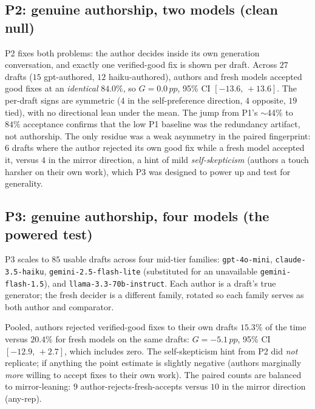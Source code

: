 \documentclass[11pt]{article}
\newcommand{\pp}{\,pp}
\newcommand{\CI}[2]{$[#1,\,#2]$}
\begin{document}
\subsection{P2: genuine authorship, two models (clean null)}

P2 fixes both problems: the author decides inside its own generation conversation, and exactly
one verified-good fix is shown per draft. Across $27$ drafts ($15$ gpt-authored, $12$
haiku-authored), authors and fresh models accepted good fixes at an \emph{identical} $84.0\%$,
so $G=0.0\pp$, 95\% CI \CI{-13.6}{+13.6}. The per-draft signs are symmetric ($4$ in the
self-preference direction, $4$ opposite, $19$ tied), with no directional lean under the mean.
The jump from P1's $\sim$44\% to $84\%$ acceptance confirms that the low P1 baseline was the
redundancy artifact, not authorship. The only residue was a weak asymmetry in the paired
fingerprint: $6$ drafts where the author rejected its own good fix while a fresh model accepted
it, versus $4$ in the mirror direction, a hint of mild \emph{self-skepticism} (authors a touch
harsher on their own work), which P3 was designed to power up and test for generality.

\subsection{P3: genuine authorship, four models (the powered test)}

P3 scales to $85$ usable drafts across four mid-tier families: \texttt{gpt-4o-mini},
\texttt{claude-3.5-haiku}, \texttt{gemini-2.5-flash-lite} (substituted for an unavailable
\texttt{gemini-flash-1.5}), and \texttt{llama-3.3-70b-instruct}. Each author is a draft's true
generator; the fresh decider is a different family, rotated so each family serves as both author
and comparator.

Pooled, authors rejected verified-good fixes to their own drafts $15.3\%$ of the time versus
$20.4\%$ for fresh models on the same drafts: $G=-5.1\pp$, 95\% CI \CI{-12.9}{+2.7}, which
includes zero. The self-skepticism hint from P2 did \emph{not} replicate; if anything the point
estimate is slightly negative (authors marginally \emph{more} willing to accept fixes to their
own work). The paired counts are balanced to mirror-leaning: $9$ author-rejects-fresh-accepts
versus $10$ in the mirror direction (any-rep).
\end{document}
